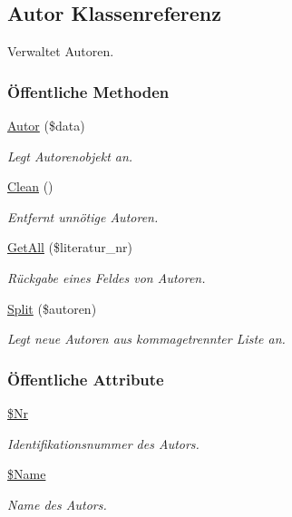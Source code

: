 \hypertarget{classAutor}{
\subsection{Autor Klassenreferenz}
\label{classAutor}
}
Verwaltet Autoren.  


\subsubsection*{\"{O}ffentliche Methoden}
\begin{CompactItemize}
\item 
\hyperlink{classAutor_2302710dd8970853f5d49c62d4586e8f}{Autor} (\$data)
\begin{CompactList}\small\item\em Legt Autorenobjekt an. \item\end{CompactList}\item 
\hyperlink{classAutor_77b27af7e471abe5a404fc92c7319921}{Clean} ()
\begin{CompactList}\small\item\em Entfernt unnötige Autoren. \item\end{CompactList}\item 
\hyperlink{classAutor_79cd90084cab240919a5daecf39156a7}{Get\-All} (\$literatur\_\-nr)
\begin{CompactList}\small\item\em Rückgabe eines Feldes von Autoren. \item\end{CompactList}\item 
\hyperlink{classAutor_2ba5418b6622f414fa8a054e6c2a2db8}{Split} (\$autoren)
\begin{CompactList}\small\item\em Legt neue Autoren aus kommagetrennter Liste an. \item\end{CompactList}\end{CompactItemize}
\subsubsection*{\"{O}ffentliche Attribute}
\begin{CompactItemize}
\item 
\hyperlink{classAutor_23e64634d5dc31b41b7ee9c49b9ea6b9}{\$Nr}
\begin{CompactList}\small\item\em Identifikationsnummer des Autors. \item\end{CompactList}\item 
\hyperlink{classAutor_8602b5705cef83e7c16f4040f9add56d}{\$Name}
\begin{CompactList}\small\item\em Name des Autors. \item\end{CompactList}\end{CompactItemize}


